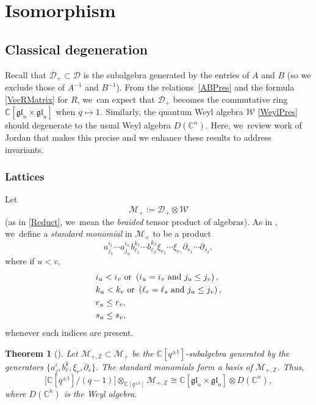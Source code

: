 \documentclass[JEP,XML,SOM,Unicode,published]{cedram}
\newcommand\mto{\mathchoice{\longmapsto}{\mapsto}{\mapsto}{\mapsto}}
\newtheorem{thm}{Theorem}[section]
\theoremstyle{definition}
\newcommand{\ZZ}{\mathbb{Z}}
\newcommand{\CC}{\mathbb{C}}
\newcommand{\DD}{\mathcal{D}}
\newcommand{\WW}{\mathcal{W}}
\newcommand{\MM}{\mathcal{M}}
\newcommand{\del}{\partial}
\begin{document}
\section{Isomorphism}

\subsection{Classical degeneration}\label{ClassDegen}
Recall that $\DD_+\subset\DD$ is the subalgebra generated by the entries of $A$ and $B$ (so we exclude those of $A^{-1}$ and $B^{-1}$).
From the relations~\eqref{ABPres} and the formula \eqref{VecRMatrix} for $R$, we~can expect that $\DD_+$ becomes the commutative ring $\CC[\mathfrak{gl}_n\times\mathfrak{gl}_n]$ when $q\mto1$.
Similarly, the quantum Weyl algebra $\WW$ \eqref{WeylPres} should degenerate to the usual Weyl algebra $D(\CC^n)$.
Here, we~review work of Jordan \cite{JordanMult} that makes this precise and we enhance these results to address invariants.

\subsubsection{Lattices}
Let
\[
\MM_+:=\DD_+\otimes\WW
\]
(as in \ref{Reduct}, we~mean the \textit{braided} tensor product of algebras).
As in \cite{JordanMult}, we~define a \textit{standard monomial} in $\MM_+$ to be a product
\begin{equation}
a^{i_1}_{j_1}\cdots a^{i_{\alpha}}_{j_{\alpha}}
b^{k_1}_{\ell_1}\cdots b^{k_{\beta}}_{\ell_{\beta}}
\xi_{r_1}\cdots \xi_{r_\gamma}
\del_{s_1}\cdots\del_{s_\delta},
\label{StandardMon}
\end{equation}
where if $u<v$,
\begin{equation}
\begin{aligned}
&i_u<i_v\hbox{ or }\left(i_u=i_v\hbox{ and }j_u\le j_v\right),\\
&k_u<k_v\hbox{ or }\left(\ell_r=\ell_s\hbox{ and }j_u\le j_v\right),\\
&r_u\le r_v,\\
&s_u\le s_v,
\end{aligned}
\label{StandardIndices}
\end{equation}
whenever such indices are present.

\begin{thm}[\cite{JordanMult}]\label{JorBasis}
Let $\MM_{+,\ZZ}\subset\MM_+$ be the $\CC[q^{\pm 1}]$-subalgebra generated by the generators $\{a^i_j, b^k_\ell, \xi_r, \del_s\}$.
The standard monomials form a basis of $\MM_{+,\ZZ}$.
Thus,
\[
\bigl[ \CC[q^{\pm1}]\big/(q-1) \bigr]\otimes_{\CC[q^{\pm 1}]}\MM_{+,\ZZ}\cong \CC[\mathfrak{gl}_n\times\mathfrak{gl}_n]\otimes D(\CC^n),
\]
where $D(\CC^n)$ is the Weyl algebra.
\end{thm}
\end{document}
